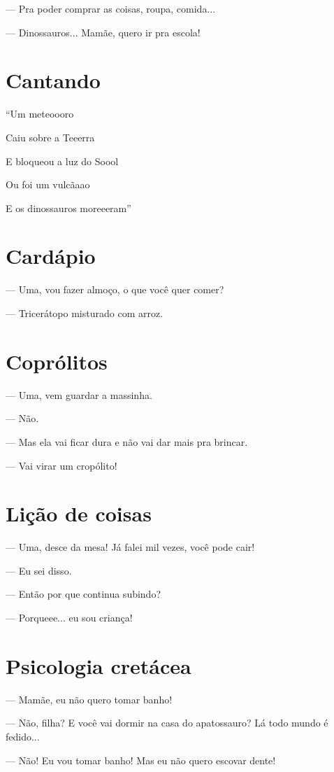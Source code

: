— Pra poder comprar as coisas, roupa, comida...

— Dinossauros... Mamãe, quero ir pra escola!

\chapter{Cantando}

``Um meteoooro

Caiu sobre a Teeerra

E bloqueou a luz do Soool

Ou foi um vulcãaao

E os dinossauros moreeeram''

\chapter{Cardápio}

— Uma, vou fazer almoço, o que você quer comer?

— Tricerátopo misturado com arroz.

\chapter{Coprólitos}

— Uma, vem guardar a massinha.

— Não.

— Mas ela vai ficar dura e não vai dar mais pra brincar.

— Vai virar um cropólito!

\chapter{Lição de coisas}

— Uma, desce da mesa! Já falei mil vezes, você pode cair!

— Eu sei disso.

— Então por que continua subindo?

— Porqueee... eu sou criança!

\chapter{Psicologia cretácea}

— Mamãe, eu não quero tomar banho!

— Não, filha? E você vai dormir na casa do apatossauro? Lá todo mundo é
fedido...

— Não! Eu vou tomar banho! Mas eu não quero escovar dente!

